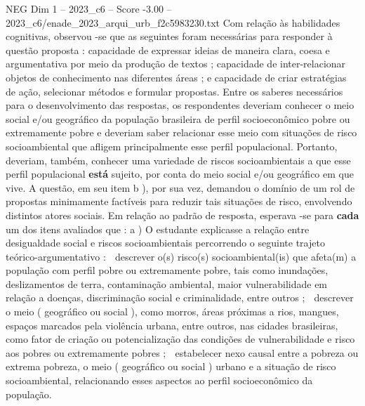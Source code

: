 \begin{textsample}{NEG Dim 1 – 2023\_c6 – Score -3.00 – 2023\_c6/enade\_2023\_arqui\_urb\_f2c5983230.txt}
Com relação às habilidades cognitivas, observou -se que as seguintes foram necessárias para responder à questão proposta : capacidade de expressar ideias de maneira clara, coesa e argumentativa por meio da produção de textos ; capacidade de inter-relacionar objetos de conhecimento nas diferentes áreas ; e capacidade de criar estratégias de ação, selecionar métodos e formular propostas.
Entre os saberes necessários para o desenvolvimento das respostas, os respondentes deveriam conhecer o meio social e/ou geográfico da população brasileira de perfil socioeconômico pobre ou extremamente pobre e deveriam saber relacionar esse meio com situações de risco socioambiental que afligem principalmente esse perfil populacional.
Portanto, deveriam, também, conhecer uma variedade de riscos socioambientais a que esse perfil populacional \textbf{está} sujeito, por conta do meio social e/ou geográfico em que vive.
A questão, em seu item b ), por sua vez, demandou o domínio de um rol de propostas minimamente factíveis para reduzir tais situações de risco, envolvendo distintos atores sociais.
Em relação ao padrão de resposta, esperava -se para \textbf{cada} um dos itens avaliados que : a ) O estudante explicasse a relação entre desigualdade social e riscos socioambientais percorrendo o seguinte trajeto teórico-argumentativo :  descrever o(s) risco(s) socioambiental(is) que afeta(m) a população com perfil pobre ou extremamente pobre, tais como inundações, deslizamentos de terra, contaminação ambiental, maior vulnerabilidade em relação a doenças, discriminação social e criminalidade, entre outros ;  descrever o meio ( geográfico ou social ), como morros, áreas próximas a rios, mangues, espaços marcados pela violência urbana, entre outros, nas cidades brasileiras, como fator de criação ou potencialização das condições de vulnerabilidade e risco aos pobres ou extremamente pobres ;  estabelecer nexo causal entre a pobreza ou extrema pobreza, o meio ( geográfico ou social ) urbano e a situação de risco socioambiental, relacionando esses aspectos ao perfil socioeconômico da população.

\end{textsample}

